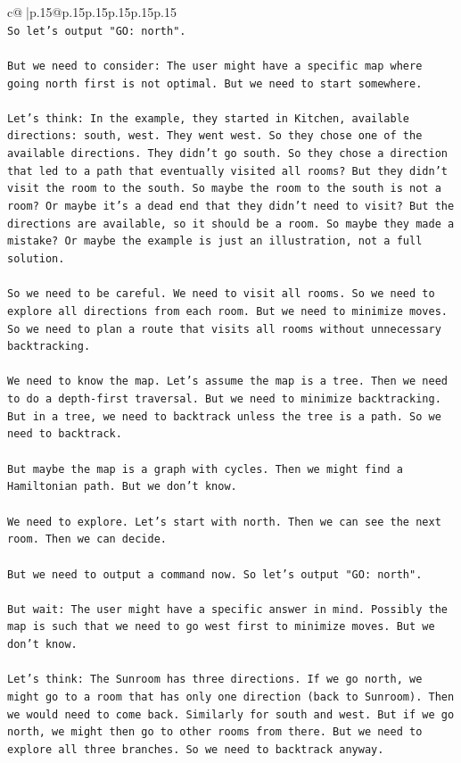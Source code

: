 \documentclass{article}
\begin{document}
{\begin{supertabular}{c@{$\;$}|p{.15\linewidth}@{}p{.15\linewidth}p{.15\linewidth}p{.15\linewidth}p{.15\linewidth}p{.15\linewidth}}
{{{\\ 
\texttt{So let's output "GO: north".} \\
\\ 
\texttt{But we need to consider: The user might have a specific map where going north first is not optimal. But we need to start somewhere.} \\
\\ 
\texttt{Let's think: In the example, they started in Kitchen, available directions: south, west. They went west. So they chose one of the available directions. They didn't go south. So they chose a direction that led to a path that eventually visited all rooms? But they didn't visit the room to the south. So maybe the room to the south is not a room? Or maybe it's a dead end that they didn't need to visit? But the directions are available, so it should be a room. So maybe they made a mistake? Or maybe the example is just an illustration, not a full solution.} \\
\\ 
\texttt{So we need to be careful. We need to visit all rooms. So we need to explore all directions from each room. But we need to minimize moves. So we need to plan a route that visits all rooms without unnecessary backtracking.} \\
\\ 
\texttt{We need to know the map. Let's assume the map is a tree. Then we need to do a depth{-}first traversal. But we need to minimize backtracking. But in a tree, we need to backtrack unless the tree is a path. So we need to backtrack.} \\
\\ 
\texttt{But maybe the map is a graph with cycles. Then we might find a Hamiltonian path. But we don't know.} \\
\\ 
\texttt{We need to explore. Let's start with north. Then we can see the next room. Then we can decide.} \\
\\ 
\texttt{But we need to output a command now. So let's output "GO: north".} \\
\\ 
\texttt{But wait: The user might have a specific answer in mind. Possibly the map is such that we need to go west first to minimize moves. But we don't know.} \\
\\ 
\texttt{Let's think: The Sunroom has three directions. If we go north, we might go to a room that has only one direction (back to Sunroom). Then we would need to come back. Similarly for south and west. But if we go north, we might then go to other rooms from there. But we need to explore all three branches. So we need to backtrack anyway.} \\
}}}
\end{supertabular}}
\end{document}
